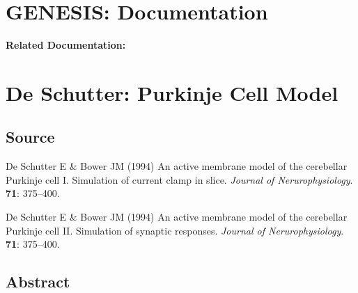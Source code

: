 \documentclass[12pt]{article}
\begin{document}
\section*{GENESIS: Documentation}

{\bf Related Documentation:}

\section*{De Schutter: Purkinje Cell Model}

\subsection*{Source}

De Schutter E \& Bower JM (1994) An active membrane model of the cerebellar Purkinje cell I. Simulation of current clamp in slice. {\it Journal of Nerurophysiology}. {\bf 71}: 375--400.

\noindent De Schutter E \& Bower JM (1994) An active membrane model of the cerebellar Purkinje cell II. Simulation of synaptic responses. {\it Journal of Nerurophysiology}. {\bf 71}: 375--400.

\subsection*{Abstract}
\end{document}
